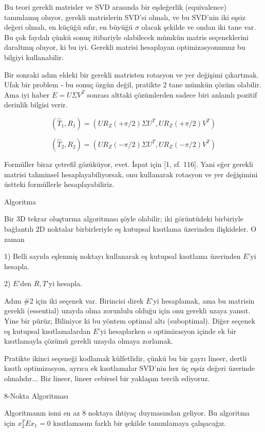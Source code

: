 \documentclass[12pt,fleqn]{article}\usepackage{../../common}
\begin{document}
Bu teori gerekli matrisler ve SVD arasında bir eşdeğerlik (equivalence)
tanımlamış oluyor, gerekli matrislerin SVD'si olmalı, ve bu SVD'nin iki eşsiz
değeri olmalı, en küçüğü sıfır, en büyüğü $\sigma$ olacak şekilde ve ondan iki
tane var. Bu çok faydalı çünkü sonuç itibariyle olabilecek mümkün matris
seçeneklerini daraltmış oluyor, ki bu iyi. Gerekli matrisi hesaplayan
optimizasyonumuz bu bilgiyi kullanabilir.

Bir sonraki adım eldeki bir gerekli matristen rotasyon ve yer değişimi
çıkartmak. Ufak bir problem - bu sonuç özgün değil, pratikte 2 tane mümkün çözüm
olabilir. Ama iyi haber $E = U\Sigma V^T$ sonrası alttaki çözümlerden sadece
biri anlamlı pozitif derinlik bilgisi verir.

$$ 
(\hat{T}_1,R_1) = (UR_Z(+\pi/2)\Sigma U^T, UR_Z(+\pi/2)V^T)
$$

$$ 
(\hat{T}_2,R_2) = (UR_Z(-\pi/2)\Sigma U^T, UR_Z(-\pi/2)V^T)
$$

Formüller biraz çetrefil gözüküyor, evet. İspat için [1, sf. 116]. Yani eğer
gerekli matrisi tahminsel hesaplayabiliyorsak, onu kullanarak rotasyon ve yer
değişimini üstteki formüllerle hesaplayabiliriz.

Algoritma

Bir 3D tekrar oluşturma algoritması şöyle olabilir; iki görüntüdeki birbiriyle
bağlantılı 2D noktalar birbirleriyle eş kutupsal kısıtlama üzerinden
ilişkideler. O zaman

1) Belli sayıda eşlenmiş noktayı kullanarak eş kutupsal kısıtlama üzerinden
$E$'yi hesapla.

2) $E$'den $R,T$'yi hesapla. 

Adım \#2 için iki seçenek var. Birincisi direk $E$'yi hesaplamak, ama bu
matrisin gerekli (essential) uzayda olma zorunlulu olduğu için onu gerekli uzaya
yansıt. Yine bir pürüz; Biliniyor ki bu yöntem optimal altı (suboptimal). Diğer
seçenek eş kutupsal kısıtlamalardan $E$'yi hesaplarken o optimizasyon içinde ek
bir kısıtlamayla çözümü gerekli uzayda olmaya zorlamak.

Pratikte ikinci seçeneği kodlamak külfetlidir, çünkü bu bir gayrı lineer, dertli
kısıtlı optimizasyon, ayrıca ek kısıtlamalar SVD'nin her üç eşsiz değeri
üzerinde olmalıdır... Biz lineer, lineer cebirsel bir yaklaşım tercih ediyoruz.

8-Nokta Algoritması

Algoritmanın ismi en az 8 noktaya ihtiyaç duymasından geliyor.  Bu algoritma
için $x_2^TEx_1 = 0$ kısıtlamasını farklı bir şekilde tanımlamaya çalışacağız.
\end{document}
